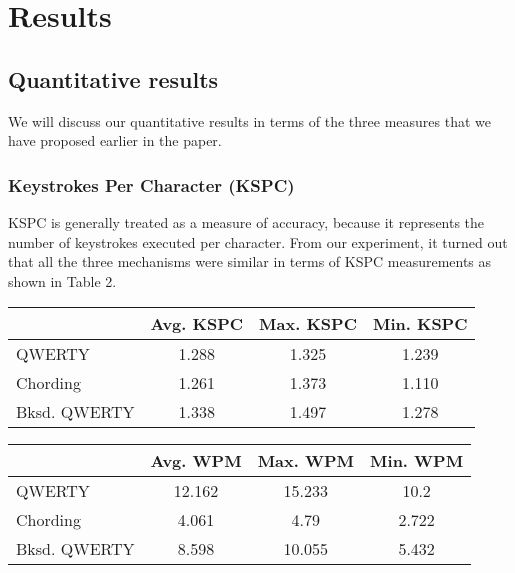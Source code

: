 \section{Results}
\subsection{Quantitative results}

We will discuss our quantitative results in terms of the three
measures that we have proposed earlier in the paper.

\subsubsection{Keystrokes Per Character (KSPC)}

KSPC is generally treated as a measure of accuracy, because it
represents the number of keystrokes executed per character. From our
experiment, it turned out that all the three mechanisms were similar
in terms of KSPC measurements as shown in Table 2.

\begin{table*}
\begin{minipage}[b]{0.5\linewidth}
	\centering
		\begin{tabular}{|l|c|c|c|} \hline
		                         & Avg. KSPC & Max. KSPC & Min. KSPC \\ \hline
			 QWERTY & 1.288 & 1.325 & 1.239 \\ \hline
			 Chording & 1.261 & 1.373 & 1.110 \\ \hline
			 Bksd. QWERTY & 1.338 & 1.497 & 1.278 \\ \hline
		\end{tabular}
	\caption{KSPC Statistics}
	\label{tab:StatisticsForTextCorpora}
\end{minipage}	
\begin{minipage}[b]{0.5\linewidth}
	\centering
		\begin{tabular}{|l|c|c|c|} \hline
		                         & Avg. WPM & Max. WPM & Min. WPM \\ \hline
			 QWERTY & 12.162 & 15.233 & 10.2 \\ \hline
			 Chording & 4.061 & 4.79 & 2.722 \\ \hline
			 Bksd. QWERTY & 8.598 & 10.055 & 5.432 \\ \hline
		\end{tabular}
	\caption{WPM Statistics}
	\label{tab:StatisticsForTextCorpora}
\end{minipage}
\end{table*}


